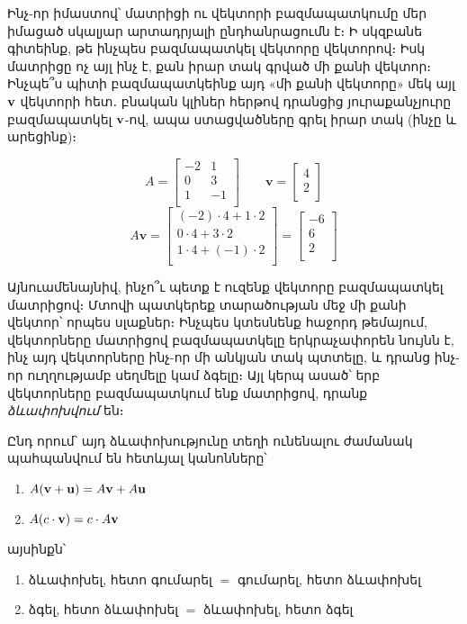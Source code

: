 Ինչ-որ իմաստով՝ մատրիցի ու վեկտորի բազմապատկումը մեր իմացած սկալյար արտադրյալի ընդհանրացումն է։ Ի սկզբանե գիտեինք, թե ինչպես բազմապատկել վեկտորը վեկտորով։ Իսկ մատրիցը ոչ այլ ինչ է, քան իրար տակ գրված մի քանի վեկտոր։ Ինչպե՞ս պիտի բազմապատկեինք այդ «մի քանի վեկտորը» մեկ այլ $\mathbf{v}$ վեկտորի հետ․ բնական կլիներ հերթով դրանցից յուրաքանչյուրը բազմապատկել $\mathbf{v}$-ով, ապա ստացվածները գրել իրար տակ (ինչը և արեցինք)։

\begin{example}
\[
  A = \begin{bmatrix}
    -2 & 1 \\
    0 & 3 \\
    1 & -1 \\
  \end{bmatrix}
  \qquad
  \mathbf{v} = \begin{bmatrix}
    4 \\
    2 \\
  \end{bmatrix}
\]
\[
  A\mathbf{v} = \begin{bmatrix}
    (-2) \cdot 4 + 1 \cdot 2 \\
    0 \cdot 4 + 3 \cdot 2 \\
    1 \cdot 4 + (-1) \cdot 2 \\
  \end{bmatrix}
  = \begin{bmatrix}
    -6 \\
    6 \\
    2 \\
  \end{bmatrix}
\]
\end{example}


Այնուամենայնիվ, ինչո՞ւ պետք է ուզենք վեկտորը բազմապատկել մատրիցով։
Մտովի պատկերեք տարածության մեջ մի քանի վեկտոր՝ որպես սլաքներ։
Ինչպես կտեսնենք հաջորդ թեմայում, վեկտորները մատրիցով բազմապատկելը երկրաչափորեն նույնն է, ինչ այդ վեկտոր\-ները ինչ-որ մի անկյան տակ պտտելը, և դրանց ինչ-որ ուղղությամբ սեղմելը կամ ձգելը։ Այլ կերպ ասած՝ երբ վեկտորները բազմապատկում ենք մատրիցով, դրանք \textit{ձևափոխվում} են։ 

Ընդ որում՝ այդ ձևափոխությունը տեղի ունենալու ժամանակ պահպան\-վում են հետևյալ կանոնները՝
\begin{enumerate}
    \item $A(\mathbf{v}+\mathbf{u})=A\mathbf{v} + A\mathbf{u}$
    \item $A(c \cdot \mathbf{v}) = c \cdot A\mathbf{v}$
\end{enumerate}
այսինքն՝ 
\begin{enumerate}
    \item ձևափոխել, հետո գումարել $=$ գումարել, հետո ձևափոխել
    \item ձգել, հետո ձևափոխել $=$ ձևափոխել, հետո ձգել
\end{enumerate}

